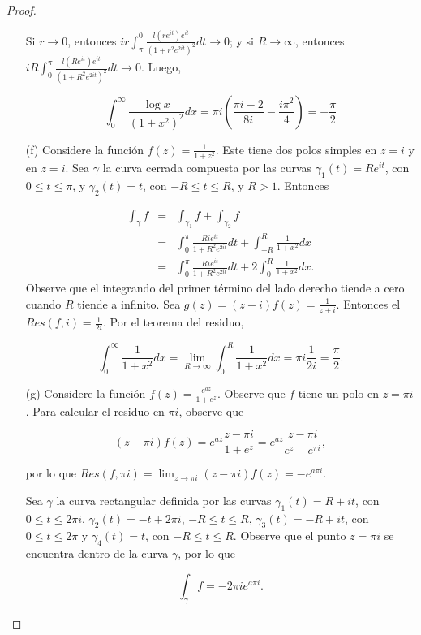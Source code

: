 \documentclass[12pt]{article}
\begin{document}
\begin{proof}
\begin{itemize}
Si $r \to 0$, entonces $ir \int_{\pi}^0 \frac{l(re^{it}) e^{it}}{(1+r^2 e^{2it})^2}dt \to 0$; y si $R \to \infty$, entonces $iR \int_0^\pi \frac{l(Re^{it}) e^{it}}{(1 + R^2 e^{2it})^2} dt \to 0$. Luego,

$$
\int_0^\infty \frac{\log x}{(1+x^2)^2} dx =  \pi i \left( \frac{\pi i -2}{8i} - \frac{i \pi^2}{4} \right) = - \frac{\pi}{2}
$$


\item[(f)] Considere la función $f(z) = \frac{1}{1 + z^2}$. Este tiene dos polos simples en $z = i$ y en $z = i.$ Sea $\gamma$ la curva cerrada compuesta por las curvas $\gamma_1(t) = R e^{it}$, con $0 \leq t \leq \pi$, y $\gamma_2(t) = t$, con $- R \leq t \leq R$,  y $R > 1.$ Entonces

\begin{eqnarray*}
\int_\gamma f &=& \int_{\gamma_1} f + \int_{\gamma_2} f \\
&=& \int_0^\pi \frac{Ri e^{it}}{1 + R^2 e^{2it}} dt + \int_{-R}^R \frac{1}{1 + x^2} dx \\
&=& \int_0^\pi \frac{Ri e^{it}}{1 + R^2 e^{2it}} dt + 2 \int_0^R \frac{1}{1 + x^2} dx.
\end{eqnarray*}
Observe que el integrando del primer término del lado derecho tiende a cero cuando $R$ tiende a infinito. Sea $g(z) = (z-i)f(z) = \frac{1}{z+i}$. Entonces el $Res(f, i) = \frac{1}{2i}.$ Por el teorema del residuo,

$$\int_0^\infty \frac{1}{1 + x^2} dx = \lim_{R \to \infty} \int_0^R \frac{1}{1 + x^2} dx = \pi i \frac{1}{2i} = \frac{\pi}{2}. $$

\item[(g)] Considere la función $f(z) = \frac{e^{az}}{1+e^z}$. Observe que $f$ tiene un polo en $z=\pi i$. Para calcular el residuo en $\pi i$, observe que 

$$ (z - \pi i) f(z) = e^{az} \frac{z - \pi i}{1 + e^z} = e^{az} \frac{z- \pi i}{e^z - e^{\pi i}},$$

por lo que  $Res(f, \pi i) = \lim_{z \to \pi i} (z - \pi i) f(z) = - e^{a \pi i}.$

Sea $\gamma$ la curva rectangular definida por las curvas $\gamma_1(t) = R + it$, con $0 \leq t \leq 2 \pi i$, $\gamma_2(t) = -t + 2 \pi i$, $-R \leq t \leq R$, $\gamma_3(t) = -R + it$, con $0 \leq t \leq 2\pi$ y $\gamma_4(t) = t$, con $-R \leq t \leq R.$ Observe que el punto $z=\pi i$ se encuentra dentro de la curva $\gamma$, por lo que 

$$\int_\gamma f = -2\pi i e^{a \pi i}.$$


\end{itemize}
\end{proof}
\end{document}

